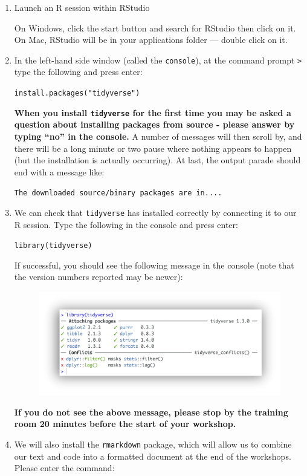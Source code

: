 \documentclass[]{book}
\begin{document}
\begin{enumerate}
\def\labelenumi{\arabic{enumi}.}
\item
  Launch an R session within RStudio

  On Windows, click the start button and search for RStudio then click
  on it. On Mac, RStudio will be in your applications folder --- double
  click on it.
\item
  In the left-hand side window (called the \texttt{console}), at the
  command prompt \texttt{\textgreater{}} type the following and press
  enter:

  \texttt{install.packages("tidyverse")}

  \textbf{When you install \texttt{tidyverse} for the first time you may
  be asked a question} \textbf{about installing packages from source -
  please answer by typing ``no'' in the console.} A number of messages
  will then scroll by, and there will be a long minute or two pause
  where nothing appears to happen (but the installation is actually
  occurring). At last, the output parade should end with a message like:

  \texttt{The\ downloaded\ source/binary\ packages\ are\ in....}
\item
  We can check that \texttt{tidyverse} has installed correctly by
  connecting it to our R session. Type the following in the console and
  press enter:

  \texttt{library(tidyverse)}

  If successful, you should see the following message in the console
  (note that the version numbers reported may be newer):

  \begin{figure}
  \centering
  \includegraphics{R/Rinstall/images/tidyverse_install.png}
  \caption{}
  \end{figure}

  \textbf{If you do not see the above message, please stop by the
  training room 20 minutes before the start of your workshop.}
\item
  We will also install the \texttt{rmarkdown} package, which will allow
  us to combine our text and code into a formatted document at the end
  of the workshops. Please enter the command:


\end{enumerate}
\end{document}
